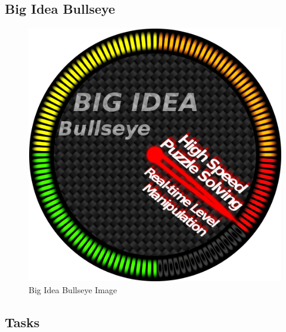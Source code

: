\documentclass[12pt, letterpaper]{scrartcl}
\begin{document}
	\subsection{Big Idea Bullseye}
	\begin{figure}[ht]
		\centering
		\includegraphics[scale=0.7]{images/bigIdeaBullseye}
		\caption{Big Idea Bullseye Image}
		\label{bigIdeaBullseye}
	\end{figure}
	
	\subsection{Tasks}
	
\end{document}
